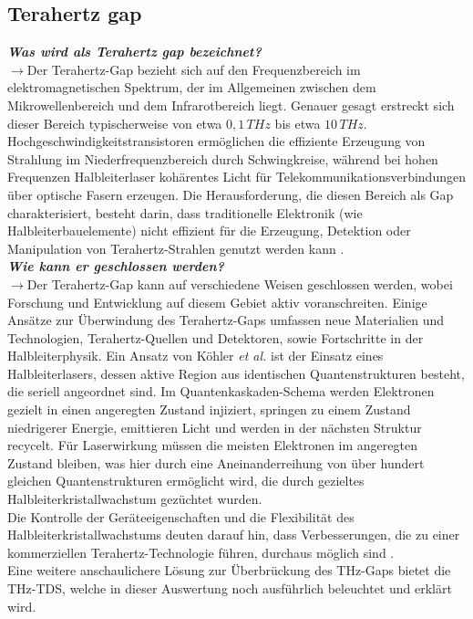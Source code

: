 \subsection{\label{subsec:FZV2}Terahertz gap}
\textbf{\textit{Was wird als Terahertz gap bezeichnet?}}\\
$\rightarrow$Der Terahertz-Gap bezieht sich auf den Frequenzbereich im elektromagnetischen Spektrum, 
der im Allgemeinen zwischen dem Mikrowellenbereich und dem Infrarotbereich liegt. 
Genauer gesagt erstreckt sich dieser Bereich typischerweise von 
etwa $0,1\,\si{THz}$ bis etwa $10\,\si{THz}$.
Hochgeschwindigkeitstransistoren ermöglichen die effiziente Erzeugung von Strahlung im 
Niederfrequenzbereich durch Schwingkreise, während bei hohen Frequenzen Halbleiterlaser 
kohärentes Licht für Telekommunikationsverbindungen über optische Fasern erzeugen.
Die Herausforderung, die diesen Bereich als Gap charakterisiert, besteht darin, 
dass traditionelle Elektronik (wie Halbleiterbauelemente) nicht effizient für die Erzeugung, 
Detektion oder Manipulation von Terahertz-Strahlen genutzt werden kann \cite{Gap}. \\ 

\textbf{\textit{Wie kann er geschlossen werden?}}\\
$\rightarrow$Der Terahertz-Gap kann auf verschiedene Weisen geschlossen werden, 
wobei Forschung und Entwicklung auf diesem Gebiet aktiv voranschreiten. 
Einige Ansätze zur Überwindung des Terahertz-Gaps umfassen neue Materialien und Technologien,
Terahertz-Quellen und Detektoren, sowie Fortschritte in der Halbleiterphysik. 
Ein Ansatz von Köhler \textit{et al.} \cite{Kohler} ist der Einsatz eines Halbleiterlasers,
dessen aktive Region aus identischen Quantenstrukturen besteht, die seriell angeordnet sind. 
Im Quantenkaskaden-Schema werden Elektronen gezielt in einen angeregten Zustand injiziert, 
springen zu einem Zustand niedrigerer Energie, emittieren Licht und werden in der 
nächsten Struktur recycelt. Für Laserwirkung müssen die meisten Elektronen im angeregten Zustand bleiben, 
was hier durch eine Aneinanderreihung von über hundert gleichen Quantenstrukturen ermöglicht wird, 
die durch gezieltes Halbleiterkristallwachstum gezüchtet wurden. \\
Die Kontrolle der Geräteeigenschaften und die Flexibilität des Halbleiterkristallwachstums 
deuten darauf hin, dass Verbesserungen, die zu einer kommerziellen Terahertz-Technologie führen, 
durchaus möglich sind \cite{Gap}. \\
Eine weitere anschaulichere Lösung zur Überbrückung des THz-Gaps bietet die THz-TDS, 
welche in dieser Auswertung noch ausführlich beleuchtet und erklärt wird. \\ 

